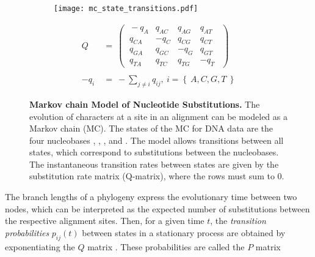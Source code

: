 \begin{figure}[hpbt]
 \begin{subfigure}[c]{.5\textwidth}
    \centering
    \texttt{[image: mc\_state\_transitions.pdf]}
    \caption{}
    \label{fig:mc_state_transitions:sub:mc_chain}
 \end{subfigure}
 \begin{subfigure}[c]{.5\textwidth}
    \begin{align*}
        Q ~&=~
         \begin{pmatrix}
         ~-q_{A}   &   q_{AC}   &   q_{AG}   &   q_{AT}~~ \\
         ~q_{CA}   &  -q_{C}    &   q_{CG}   &   q_{CT}~~ \\
         ~q_{GA}   &   q_{GC}   &  -q_{G}    &   q_{GT}~~ \\
         ~q_{TA}   &   q_{TC}   &   q_{TG}   &  -q_{T}~~
         \end{pmatrix}
        \\ \\
        - q_{i} ~&=~ - \sum_{j \neq i} q_{ij}, ~ i = \left\{~ A, C, G, T ~\right\}
    \end{align*}
    \caption{}
    \label{fig:mc_state_transitions:sub:matrix}
  \end{subfigure}
    \caption[Markov chain model of nucleotide substitutions]{
        \textbf{Markov chain Model of Nucleotide Substitutions.}
        The evolution of characters at a site in an alignment can be modeled as a Markov chain (MC).
         The states of the MC for DNA data are
        the four nucleobases , , , and .
        The model allows transitions between all states, which correspond to substitutions between the nucleobases.
         The instantaneous transition rates between states are given
        by the substitution rate matrix (Q-matrix), where the rows must sum to $0$.
    }
    \label{fig:mc_state_transitions}
\end{figure}

The branch lengths of a phylogeny express the evolutionary time between two nodes,
which can be interpreted as the expected number of substitutions between the respective alignment sites.
Then, for a given time $t$, the \emph{transition probabilities} $p_{ij}(t)$ between states in a stationary process
are obtained by exponentiating the $Q$ matrix \cite{Yang2006}.
These probabilities are called the $P$ matrix

